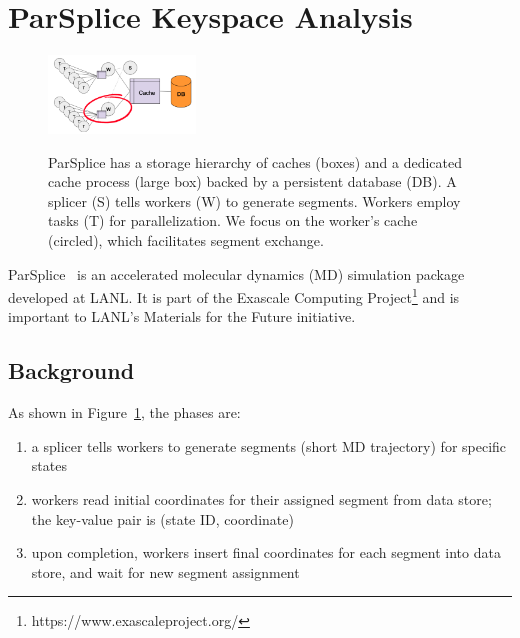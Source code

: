 \section{ParSplice Keyspace Analysis}
\label{sec:parsplice-keyspace-analysis}

\begin{figure}[t]
\centering
\noindent\includegraphics[width=0.35\textwidth]{figures/parsplice.png}\\
\caption{ParSplice has a storage hierarchy of caches (boxes) and a
dedicated cache process (large box) backed by a persistent database (DB). A splicer
(S) tells workers (W) to generate segments. Workers employ tasks (T) for
parallelization. We focus on the worker's cache (circled), which facilitates
segment exchange.
\label{fig:parsplice}}
\end{figure}

ParSplice~\cite{perez:jctc20150parsplice} is an accelerated molecular dynamics
(MD) simulation package developed at LANL. It is part of the Exascale Computing
Project\footnote{https://www.exascaleproject.org/} and is important to LANL's
Materials for the Future initiative. 

\subsection{Background}

As shown in Figure~\ref{fig:parsplice}, the phases are:

\begin{enumerate}

  \item a splicer tells workers to generate segments (short MD trajectory) for
  specific states

  \item workers read initial coordinates for their assigned segment from data
  store; the key-value pair is (state ID, coordinate)

  \item upon completion, workers insert final coordinates for each segment into
  data store, and wait for new segment assignment

\end{enumerate}

